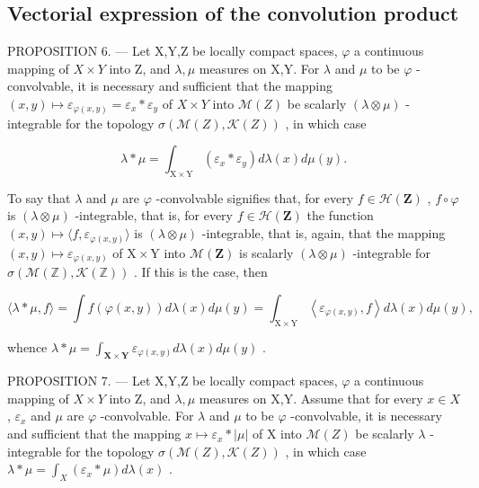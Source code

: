\subsection{Vectorial expression of the convolution product}

PROPOSITION 6. --- Let X,Y,Z be locally compact spaces, \(\varphi\) a continuous mapping of \(X \times Y\) into Z, and \(\lambda, \mu\) measures on X,Y. For \(\lambda\) and \(\mu\) to be \(\varphi\) -convolvable, it is necessary and sufficient that the mapping \((x,y) \mapsto \varepsilon_{\varphi(x,y)} = \varepsilon_x * \varepsilon_y\) of \(X \times Y\) into \(\mathcal{M}(Z)\) be scalarly \((\lambda \otimes \mu)\) -integrable for the topology \(\sigma(\mathcal{M}(Z), \mathcal{K}(Z))\) , in which case

\[
\lambda * \mu = \int_ {\mathrm{X} \times \mathrm{Y}} \left(\varepsilon_ {x} * \varepsilon_ {y}\right) d \lambda (x) d \mu (y).
\]

To say that \(\lambda\) and \(\mu\) are \(\varphi\) -convolvable signifies that, for every \(f \in \mathcal{H}(\mathbf{Z})\) , \(f \circ \varphi\) is \((\lambda \otimes \mu)\) -integrable, that is, for every \(f \in \mathcal{H}(\mathbf{Z})\) the function \((x,y) \mapsto \langle f, \varepsilon_{\varphi(x,y)} \rangle\) is \((\lambda \otimes \mu)\) -integrable, that is, again, that the mapping \((x,y) \mapsto \varepsilon_{\varphi(x,y)}\) of \(\mathrm{X} \times \mathrm{Y}\) into \(\mathcal{M}(\mathbf{Z})\) is scalarly \((\lambda \otimes \mu)\) -integrable for \(\sigma (\mathcal{M}(\mathbb{Z}),\mathcal{K}(\mathbb{Z}))\) . If this is the case, then

\[
\langle \lambda * \mu , f \rangle = \int f (\varphi (x, y)) d \lambda (x) d \mu (y) = \int_ {\mathrm{X} \times \mathrm{Y}} \left\langle \varepsilon_ {\varphi (x, y)}, f \right\rangle d \lambda (x) d \mu (y),
\]

whence \(\lambda * \mu = \int_{\mathbf{X} \times \mathbf{Y}} \varepsilon_{\varphi(x, y)} d\lambda(x) d\mu(y)\) .

PROPOSITION 7. --- Let X,Y,Z be locally compact spaces, \(\varphi\) a continuous mapping of \(X \times Y\) into Z, and \(\lambda, \mu\) measures on X,Y. Assume that for every \(x \in X\) , \(\varepsilon_x\) and \(\mu\) are \(\varphi\) -convolvable. For \(\lambda\) and \(\mu\) to be \(\varphi\) -convolvable, it is necessary and sufficient that the mapping \(x \mapsto \varepsilon_x * |\mu|\) of X into \(\mathcal{M}(Z)\) be scalarly \(\lambda\) -integrable for the topology \(\sigma(\mathcal{M}(Z), \mathcal{K}(Z))\) , in which case \(\lambda * \mu = \int_{X} (\varepsilon_x * \mu) d\lambda(x)\) .

